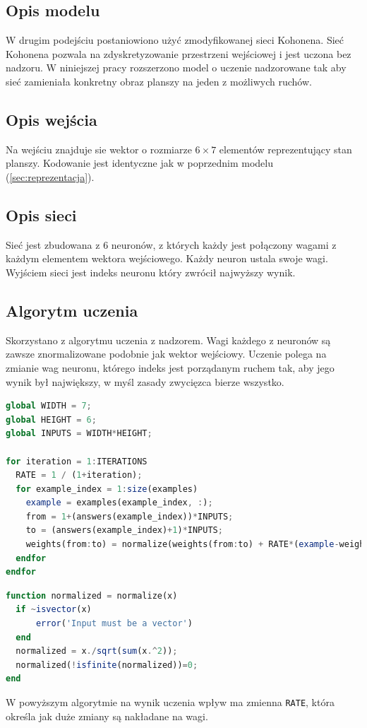 \documentclass{llncs}
\begin{document}
\subsection{Opis modelu}
W drugim podejściu postaniowiono użyć zmodyfikowanej sieci Kohonena. Sieć Kohonena pozwala na zdyskretyzowanie przestrzeni wejściowej i jest uczona bez nadzoru.
W niniejszej pracy rozszerzono model o uczenie nadzorowane tak aby sieć zamieniała konkretny obraz planszy na jeden z możliwych ruchów.

\subsection{Opis wejścia}
Na wejściu znajduje sie wektor o rozmiarze $6\times 7$ elementów reprezentujący stan planszy. Kodowanie jest identyczne jak w poprzednim modelu (\autoref{sec:reprezentacja}).

\subsection{Opis sieci}
Sieć jest zbudowana z $6$ neuronów, z których każdy jest połączony wagami z każdym elementem wektora wejściowego. 
Każdy neuron ustala swoje wagi. Wyjściem sieci jest indeks neuronu który zwrócił najwyższy wynik.

\subsection{Algorytm uczenia}
Skorzystano z algorytmu uczenia z nadzorem. Wagi każdego z neuronów są zawsze znormalizowane podobnie jak wektor wejściowy.
Uczenie polega na zmianie wag neuronu, którego indeks jest porządanym ruchem tak, aby jego wynik był największy, w myśl zasady
zwycięzca bierze wszystko.


\begin{lstlisting}[language=Octave,frame=single,caption=Implementacja algorytmu w języku Octave]
global WIDTH = 7;
global HEIGHT = 6;
global INPUTS = WIDTH*HEIGHT;

for iteration = 1:ITERATIONS
  RATE = 1 / (1+iteration);
  for example_index = 1:size(examples)
    example = examples(example_index, :);
    from = 1+(answers(example_index))*INPUTS;
    to = (answers(example_index)+1)*INPUTS;
    weights(from:to) = normalize(weights(from:to) + RATE*(example-weights(from:to)));
  endfor
endfor
\end{lstlisting}
\begin{lstlisting}[language=Octave,frame=single,caption=Implementacja normalizacji w języku Octave]
function normalized = normalize(x)
  if ~isvector(x)
      error('Input must be a vector')
  end
  normalized = x./sqrt(sum(x.^2));
  normalized(!isfinite(normalized))=0;
end
\end{lstlisting}
W powyższym algorytmie na wynik uczenia wpływ ma zmienna \texttt{RATE}, która określa jak duże zmiany są nakładane na wagi.
\end{document}
